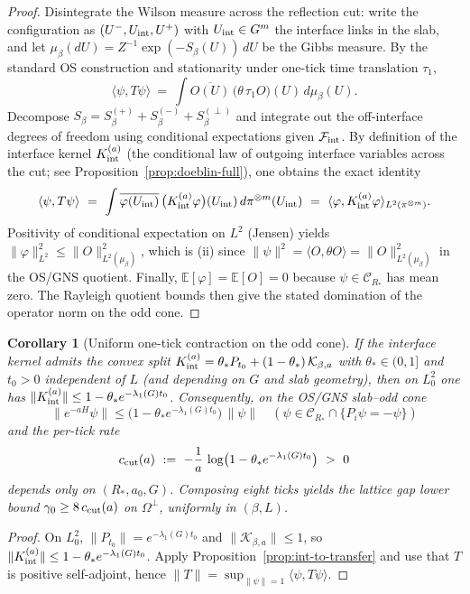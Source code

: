 \documentclass[11pt]{amsart}
\theoremstyle{plain}
\newtheorem{corollary}[theorem]{Corollary}
\theoremstyle{definition}
\theoremstyle{remark}
\begin{document}
\begin{proof}
Disintegrate the Wilson measure across the reflection cut: write the configuration as $(U^-,U_{\rm int},U^+)$ with $U_{\rm int}\in G^m$ the interface links in the slab, and let $\mu_\beta(dU)=Z^{-1}\exp(-S_\beta(U))\,dU$ be the Gibbs measure. By the standard OS construction and stationarity under one-tick time translation $\tau_1$,
\[
  \langle \psi, T\psi\rangle\ =\ \int \overline{O(U)}\,\big(\theta\,\tau_1 O\big)(U)\,d\mu_\beta(U).
\]
Decompose $S_\beta=S_\beta^{(+)}+S_\beta^{(-)}+S_\beta^{(\perp)}$ and integrate out the off-interface degrees of freedom using conditional expectations given $\mathcal F_{\rm int}$. By definition of the interface kernel $K_{\rm int}^{(a)}$ (the conditional law of outgoing interface variables across the cut; see Proposition~\ref{prop:doeblin-full}), one obtains the exact identity
\[
  \langle \psi, T\psi\rangle\ =\ \int \overline{\varphi(U_{\rm int})}\,\big(K_{\rm int}^{(a)}\varphi\big)(U_{\rm int})\,d\pi^{\otimes m}(U_{\rm int})
  \ =\ \langle \varphi, K_{\rm int}^{(a)}\varphi\rangle_{L^2(\pi^{\otimes m})}.
\]
Positivity of conditional expectation on $L^2$ (Jensen) yields $\|\varphi\|_{L^2}^2\le \|O\|_{L^2(\mu_\beta)}^2$, which is (ii) since $\|\psi\|^2=\langle O,\theta O\rangle=\|O\|_{L^2(\mu_\beta)}^2$ in the OS/GNS quotient. Finally, $\mathbb E[\varphi]=\mathbb E[O]=0$ because $\psi\in\mathcal C_{R_*}$ has mean zero. The Rayleigh quotient bounds then give the stated domination of the operator norm on the odd cone.
\end{proof}

\begin{corollary}[Uniform one-tick contraction on the odd cone]\label{cor:odd-contraction-from-Kint}
If the interface kernel admits the convex split $K_{\rm int}^{(a)}=\theta_* P_{t_0}+(1-\theta_*)\,\mathcal K_{\beta,a}$ with $\theta_*\in(0,1]$ and $t_0>0$ independent of $L$ (and depending on $G$ and slab geometry), then on $L^2_0$ one has $\|K_{\rm int}^{(a)}\|\le 1-\theta_* e^{-\lambda_1(G) t_0}$. Consequently, on the OS/GNS slab--odd cone
\begin{equation}
  \boxed{
    \|e^{-aH}\psi\| \le \big(1-\theta_* e^{-\lambda_1(G) t_0}\big)\,\|\psi\| \quad (\psi\in\mathcal C_{R_*}\cap\{P_i\psi=-\psi\})
  }
\end{equation}
and the per-tick rate
\[
  c_{\rm cut}(a)\ :=\ -\frac{1}{a}\,\log\bigl(1-\theta_* e^{-\lambda_1(G) t_0}\bigr)\ >\ 0
\]
depends only on $(R_*,a_0,G)$. Composing eight ticks yields the lattice gap lower bound $\gamma_0\ge 8\,c_{\rm cut}(a)$ on $\Omega^{\perp}$, uniformly in $(\beta,L)$.
\end{corollary}
\begin{proof}
On $L^2_0$, $\|P_{t_0}\|=e^{-\lambda_1(G) t_0}$ and $\|\mathcal K_{\beta,a}\|\le 1$, so $\|K_{\rm int}^{(a)}\|\le 1-\theta_* e^{-\lambda_1(G) t_0}$. Apply Proposition~\ref{prop:int-to-transfer} and use that $T$ is positive self-adjoint, hence $\|T\|=\sup_{\|\psi\|=1}\langle\psi,T\psi\rangle$.
\end{proof}
\end{document}
